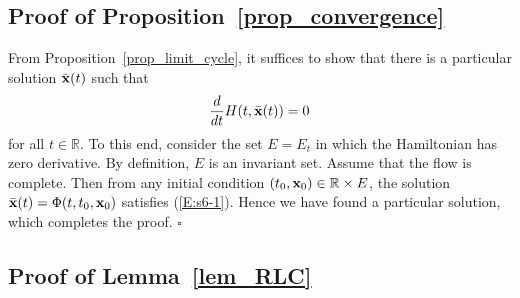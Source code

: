 \subsection{Proof of Proposition~\ref{prop_convergence}}
From Proposition~\ref{prop_limit_cycle}, it suffices to show that there is a particular solution $\bar{\mathbf{x}}(t)$ such that
\begin{equation} \label{E:s6-1}
    \frac{d}{dt} H(t, \bar{\mathbf{x}}(t)) = 0
\end{equation}
for all $t \in \mathbb{R}$. To this end, consider the set $E = E_t$ in which the Hamiltonian has zero derivative. By definition, $E$ is an invariant set. Assume that the flow is complete. Then from any initial condition $(t_0, \mathbf{x}_0) \in \mathbb{R} \times E$, the solution $\bar{\mathbf{x}}(t) = \Phi(t, t_0, \mathbf{x}_0)$ satisfies (\ref{E:s6-1}). Hence we have found a particular solution, which completes the proof. \hfill $\square$



\subsection{Proof of Lemma~\ref{lem_RLC}}

